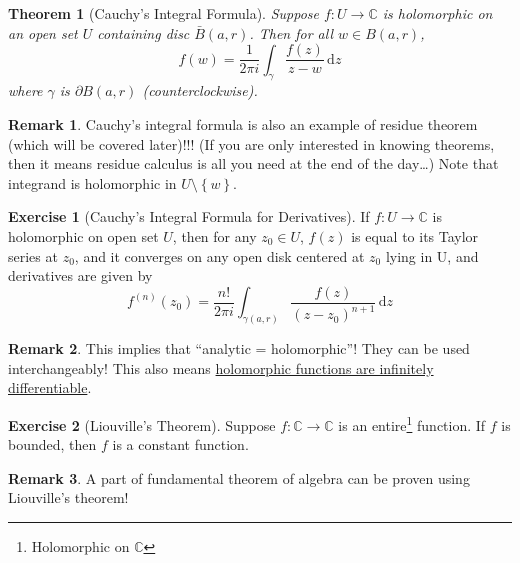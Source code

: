 \documentclass[a4paper, 12pt]{article}
\newtheorem{theorem}{Theorem}
\theoremstyle{definition}
\newtheorem{exercise}{Exercise}
\newtheorem{remark}{Remark}
\numberwithin{theorem}{section}
\numberwithin{definition}{section}
\numberwithin{exercise}{section}
\numberwithin{remark}{section}
\numberwithin{figure}{section}
\numberwithin{example}{section}
\newcommand{\C}{\mathbb{C}}
\newcommand{\intd}{\,\text{d}}
\begin{document}
\begin{theorem}[Cauchy's Integral Formula]
    Suppose $f:U \rightarrow \C$ is holomorphic on an open set $U$ containing disc $\bar B (a,r)$.
    Then for all $w \in B \left( a,r \right)$,
    \begin{equation*}
        f(w) = \frac{1}{2\pi i} \int_{\gamma} \frac{f(z)}{z-w} \intd z
    \end{equation*}
    where $\gamma$ is $\partial B (a,r)$ (counterclockwise).
\end{theorem}
\begin{remark}
    Cauchy's integral formula is also an example of residue theorem (which will be covered later)!!!
    (If you are only interested in knowing theorems, then it means
    residue calculus is all you need at the end of the day\dots)
    Note that integrand is holomorphic in $U \setminus \left\{ w \right\}$.
\end{remark}
\begin{exercise}[Cauchy's Integral Formula for Derivatives]
    If $f:U \rightarrow \C$ is holomorphic on open set $U$, then for any $z_0 \in U$,
    $f(z)$ is equal to its Taylor series at $z_0$, and it converges on any open disk
    centered at $z_0$ lying in U,
    and derivatives are given by
    \begin{equation*}
        f^{(n)} (z_0) = \frac{n!}{2\pi i} \int_{\gamma (a,r)} \frac{f(z)}{(z-z_0)^{n+1}} \intd z
    \end{equation*}
\end{exercise}
\begin{remark}
    This implies that ``analytic = holomorphic''!
    They can be used interchangeably!
    This also means \ul{holomorphic functions are infinitely differentiable}.
\end{remark}
\begin{exercise}[Liouville's Theorem]
    Suppose $f:\C \rightarrow \C$ is an entire\footnote{Holomorphic on $\C$} function.
    If $f$ is bounded, then $f$ is a constant function.
\end{exercise}
\begin{remark}
    A part of fundamental theorem of algebra can be proven using Liouville's theorem!
\end{remark}
\end{document}
